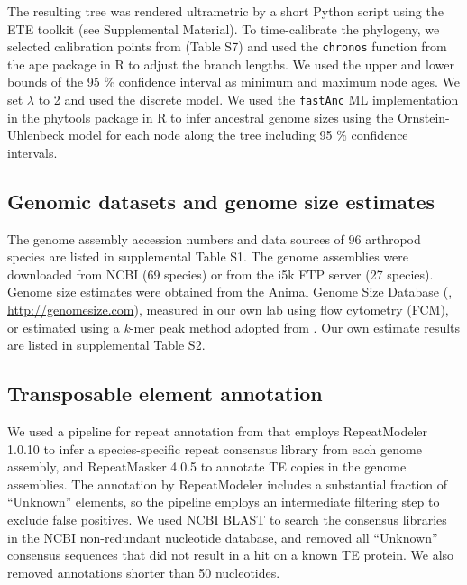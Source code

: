 The resulting tree was rendered ultrametric by a short Python script
using the ETE toolkit \citep{Huerta-Cepas2016} (see Supplemental Material). To
time-calibrate the phylogeny, we selected calibration points from
\citep{Misof2014} (Table S7) and used the \texttt{chronos} function
from the ape package in R to adjust the branch lengths. We used the
upper and lower bounds of the 95 \% confidence interval as minimum and
maximum node ages. We set \(\lambda\) to 2 and used the discrete
model. We used the \texttt{fastAnc} ML implementation in the phytools
package \citep{Revell2012} in R to infer ancestral genome sizes using
the Ornstein-Uhlenbeck model for each node along the tree including 95
\% confidence intervals.

\subsection*{Genomic datasets and genome size
estimates}\label{genomic-datasets-and-genome-size-estimates}

The genome assembly accession numbers and data sources of 96 arthropod
species are listed in supplemental Table S1. The genome assemblies were
downloaded from NCBI (69 species) or from the i5k FTP server (27
species). Genome size estimates were obtained from the Animal Genome
Size Database (\citet{Gregory2018}, \url{http://genomesize.com}),
measured in our own lab using flow cytometry (FCM), or estimated using a
\emph{k}-mer peak method adopted from \citet{Hozza2015}. Our own
estimate results are listed in supplemental Table S2.

\subsection*{Transposable element
annotation}\label{transposable-element-annotation}

We used a pipeline for repeat annotation from \citet{Petersen2019} that
employs RepeatModeler 1.0.10 \citep{Smit2015a} to infer a
species-specific repeat consensus library from each genome assembly, and
RepeatMasker 4.0.5 \citep{Smit2015} to annotate TE copies in the
genome assemblies. The annotation by RepeatModeler includes a
substantial fraction of ``Unknown'' elements, so the pipeline employs an
intermediate filtering step to exclude false positives. We used NCBI
BLAST to search the consensus libraries in the NCBI non-redundant
nucleotide database, and removed all ``Unknown'' consensus sequences
that did not result in a hit on a known TE protein. We also removed
annotations shorter than 50 nucleotides.

